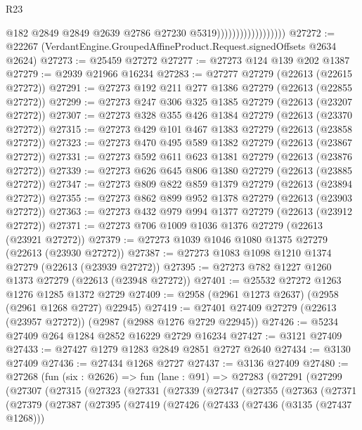 \begin{lexlean}{R23}
\begin{coremodule}
                                        @182
                                        @2849
                                        @2849
                                        @2639
                                        @2786
                                        @27230
                                        @5319))))))))))))))))))
@27272 := @22267 (VerdantEngine.GroupedAffineProduct.Request.signedOffsets @2634 @2624)
@27273 := @25459 @27272
@27277 := @27273 @124 @139 @202 @1387
@27279 := @2939 @21966 @16234
@27283 := @27277 @27279 (@22613 (@22615 @27272))
@27291 := @27273 @192 @211 @277 @1386 @27279 (@22613 (@22855 @27272))
@27299 := @27273 @247 @306 @325 @1385 @27279 (@22613 (@23207 @27272))
@27307 := @27273 @328 @355 @426 @1384 @27279 (@22613 (@23370 @27272))
@27315 := @27273 @429 @101 @467 @1383 @27279 (@22613 (@23858 @27272))
@27323 := @27273 @470 @495 @589 @1382 @27279 (@22613 (@23867 @27272))
@27331 := @27273 @592 @611 @623 @1381 @27279 (@22613 (@23876 @27272))
@27339 := @27273 @626 @645 @806 @1380 @27279 (@22613 (@23885 @27272))
@27347 := @27273 @809 @822 @859 @1379 @27279 (@22613 (@23894 @27272))
@27355 := @27273 @862 @899 @952 @1378 @27279 (@22613 (@23903 @27272))
@27363 := @27273 @432 @979 @994 @1377 @27279 (@22613 (@23912 @27272))
@27371 := @27273 @706 @1009 @1036 @1376 @27279 (@22613 (@23921 @27272))
@27379 := @27273 @1039 @1046 @1080 @1375 @27279 (@22613 (@23930 @27272))
@27387 := @27273 @1083 @1098 @1210 @1374 @27279 (@22613 (@23939 @27272))
@27395 := @27273 @782 @1227 @1260 @1373 @27279 (@22613 (@23948 @27272))
@27401 := @25532 @27272 @1263 @1276 @1285 @1372 @2729
@27409 := @2958 (@2961 @1273 @2637) (@2958 (@2961 @1268 @2727) @22945)
@27419 := @27401 @27409 @27279 (@22613 (@23957 @27272)) (@2987 (@2988 @1276 @2729 @22945))
@27426 := @5234 @27409 @264 @1284 @2852 @16229 @2729 @16234
@27427 := @3121 @27409
@27433 := @27427 @1279 @1283 @2849 @2851 @2727 @2640
@27434 := @3130 @27409
@27436 := @27434 @1268 @2727
@27437 := @3136 @27409
@27480 := @27268
    (fun (six : @2626) =>
    fun (lane : @91) =>
    @27283
      (@27291
        (@27299
          (@27307
            (@27315
              (@27323
                (@27331
                  (@27339
                    (@27347
                      (@27355
                        (@27363
                          (@27371
                            (@27379
                              (@27387
                                (@27395
                                  (@27419
                                    (@27426
                                      (@27433
                                        (@27436 (@3135 (@27437 @1268)))

\end{coremodule}
\end{lexlean}
